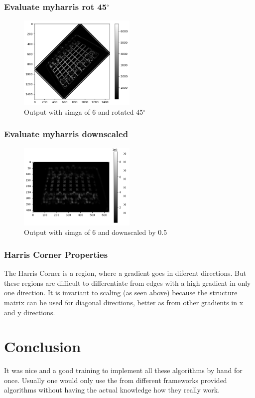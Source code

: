 \documentclass[12pt]{article}
\begin{document}
\subsubsection{Evaluate myharris rot 45$^{\circ}$}
\begin{figure}[!htb]
    \centering
    \includegraphics[width=0.5\textwidth]{pics/harris2}
    \caption{Output with simga of 6 and rotated 45$^{\circ}$}
    \label{fig:harrisrotated}
\end{figure}

\pagebreak

\subsubsection{Evaluate myharris downscaled}
\begin{figure}[!htb]
    \centering
    \includegraphics[width=0.5\textwidth]{pics/harris3}
    \caption{Output with simga of 6 and downscaled by 0.5}
    \label{fig:harrisdownscaled}
\end{figure}

\subsubsection{Harris Corner Properties}
The Harris Corner is a region, where a gradient goes in diferent directions. But these regions are difficult to
differentiate from edges with a high gradient in only one direction. It is invariant to scaling (as seen above)
because the structure matrix can be used for diagonal directions, better as from other gradients in x and y directions.

\section{Conclusion}
It was nice and a good training to implement all these 
algorithms by hand for once. Usually one would only use the 
from different frameworks provided algorithms without having
the actual knowledge how they really work.

\pagebreak
\end{document}
